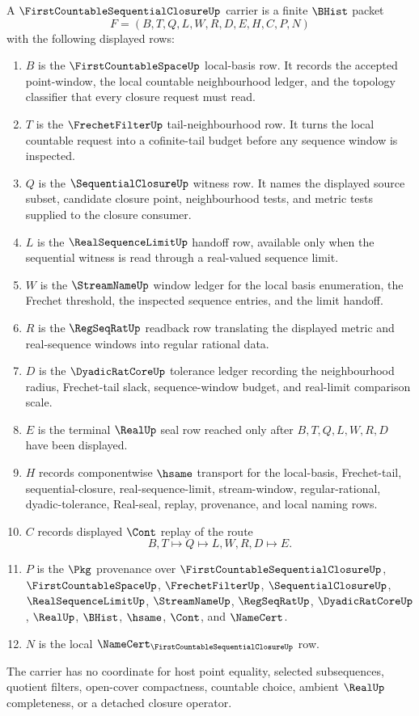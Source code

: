 \begin{definition}
\label{def:first-countable-sequential-closure}
A $\FirstCountableSequentialClosureUp$ carrier is a finite $\BHist$ packet
$$
F=(B,T,Q,L,W,R,D,E,H,C,P,N)
$$
with the following displayed rows:
\begin{enumerate}
\item $B$ is the $\FirstCountableSpaceUp$ local-basis row. It records the accepted point-window, the local countable neighbourhood ledger, and the topology classifier that every closure request must read.
\item $T$ is the $\FrechetFilterUp$ tail-neighbourhood row. It turns the local countable request into a cofinite-tail budget before any sequence window is inspected.
\item $Q$ is the $\SequentialClosureUp$ witness row. It names the displayed source subset, candidate closure point, neighbourhood tests, and metric tests supplied to the closure consumer.
\item $L$ is the $\RealSequenceLimitUp$ handoff row, available only when the sequential witness is read through a real-valued sequence limit.
\item $W$ is the $\StreamNameUp$ window ledger for the local basis enumeration, the Frechet threshold, the inspected sequence entries, and the limit handoff.
\item $R$ is the $\RegSeqRatUp$ readback row translating the displayed metric and real-sequence windows into regular rational data.
\item $D$ is the $\DyadicRatCoreUp$ tolerance ledger recording the neighbourhood radius, Frechet-tail slack, sequence-window budget, and real-limit comparison scale.
\item $E$ is the terminal $\RealUp$ seal row reached only after $B,T,Q,L,W,R,D$ have been displayed.
\item $H$ records componentwise $\hsame$ transport for the local-basis, Frechet-tail, sequential-closure, real-sequence-limit, stream-window, regular-rational, dyadic-tolerance, Real-seal, replay, provenance, and local naming rows.
\item $C$ records displayed $\Cont$ replay of the route
$$
B,T \longmapsto Q \longmapsto L,W,R,D \longmapsto E .
$$
\item $P$ is the $\Pkg$ provenance over $\FirstCountableSequentialClosureUp$, $\FirstCountableSpaceUp$, $\FrechetFilterUp$, $\SequentialClosureUp$, $\RealSequenceLimitUp$, $\StreamNameUp$, $\RegSeqRatUp$, $\DyadicRatCoreUp$, $\RealUp$, $\BHist$, $\hsame$, $\Cont$, and $\NameCert$.
\item $N$ is the local $\NameCert_{\FirstCountableSequentialClosureUp}$ row.
\end{enumerate}
The carrier has no coordinate for host point equality, selected subsequences, quotient filters, open-cover compactness, countable choice, ambient $\RealUp$ completeness, or a detached closure operator.
\end{definition}

